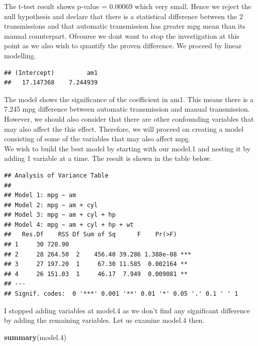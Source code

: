 \documentclass[]{article}
\newenvironment{Shaded}{\begin{snugshade}}{\end{snugshade}}
\newcommand{\KeywordTok}[1]{\textcolor[rgb]{0.13,0.29,0.53}{\textbf{#1}}}
\newcommand{\DecValTok}[1]{\textcolor[rgb]{0.00,0.00,0.81}{#1}}
\newcommand{\StringTok}[1]{\textcolor[rgb]{0.31,0.60,0.02}{#1}}
\newcommand{\OperatorTok}[1]{\textcolor[rgb]{0.81,0.36,0.00}{\textbf{#1}}}
\newcommand{\NormalTok}[1]{#1}
\begin{document}
The t-test result shows p-value = 0.00069 which very small. Hence we
reject the null hypothesis and declare that there is a statistical
difference between the 2 transmissions and that automatic transmission
has greater mpg mean than its manual counterpart. Ofcourse we dont want
to stop the investigation at this point as we also wish to quantify the
proven difference. We proceed by linear modelling.

\begin{Shaded}
\end{Shaded}

\begin{verbatim}
## (Intercept)         am1 
##   17.147368    7.244939
\end{verbatim}

The model shows the significance of the coefficient in am1. This means
there is a 7.245 mpg difference between automatic transmission and
manual transmission. However, we should also consider that there are
other confounding variables that may also affect the this effect.
Therefore, we will proceed on creating a model consisting of some of the
variables that may also affect mpg.\\
We wish to build the best model by starting with our model.1 and nesting
it by adding 1 variable at a time. The result is shown in the table
below.

\begin{verbatim}
## Analysis of Variance Table
## 
## Model 1: mpg ~ am
## Model 2: mpg ~ am + cyl
## Model 3: mpg ~ am + cyl + hp
## Model 4: mpg ~ am + cyl + hp + wt
##   Res.Df    RSS Df Sum of Sq      F    Pr(>F)    
## 1     30 720.90                                  
## 2     28 264.50  2    456.40 39.286 1.388e-08 ***
## 3     27 197.20  1     67.30 11.585  0.002164 ** 
## 4     26 151.03  1     46.17  7.949  0.009081 ** 
## ---
## Signif. codes:  0 '***' 0.001 '**' 0.01 '*' 0.05 '.' 0.1 ' ' 1
\end{verbatim}

I stopped adding variables at model.4 as we don't find any significant
difference by adding the remaining variables. Let us examine model.4
then.

\begin{Shaded}
\begin{Highlighting}[]
\KeywordTok{summary}\NormalTok{(model.}\DecValTok{4}\NormalTok{)}
\end{Highlighting}
\end{Shaded}
\end{document}
